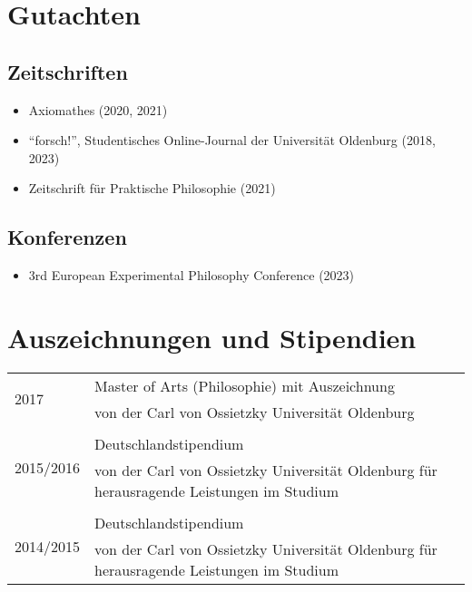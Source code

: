 \documentclass[a4paper,10pt]{article}
\begin{document}
\section{Gutachten}
\subsection*{Zeitschriften}
\begin{itemize}
   \item Axiomathes (2020, 2021)
   \item \enquote{forsch!}, Studentisches Online-Journal der Universität Oldenburg (2018, 2023)
   \item Zeitschrift für Praktische Philosophie (2021)
\end{itemize}

\subsection*{Konferenzen}
\begin{itemize}
   \item 3rd European Experimental Philosophy Conference (2023)
\end{itemize}


\clearpage
\section{Auszeichnungen und Stipendien}
\begin{longtable}{p{}p{}}
\multirow{2}{1,75cm}{\footnotesize{2017}} & Master of Arts (Philosophie) mit Auszeichnung\\
& \footnotesize{von der Carl von Ossietzky Universität Oldenburg}\\
\\
\multirow{2}{1,75cm}{\footnotesize{2015/2016}} & Deutschlandstipendium\\
& \footnotesize{von der Carl von Ossietzky Universität Oldenburg für herausragende Leistungen im Studium}\\
\\
\multirow{2}{1,75cm}{\footnotesize{2014/2015}} & Deutschlandstipendium\\
& \footnotesize{von der Carl von Ossietzky Universität Oldenburg für herausragende Leistungen im Studium}\\
\end{longtable}


\clearpage
\end{document}
